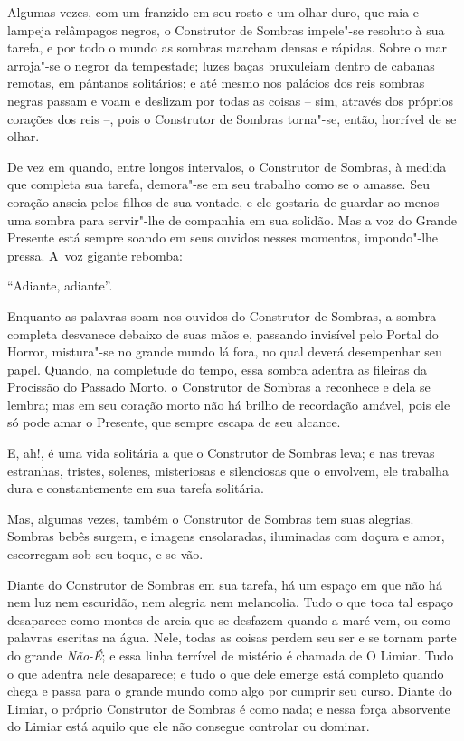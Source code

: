 Algumas vezes, com um franzido em seu rosto e um olhar duro, que raia e
lampeja relâmpagos negros, o Construtor de Sombras impele"-se resoluto à
sua tarefa, e por todo o mundo as sombras marcham densas e rápidas.
Sobre o mar arroja"-se o negror da tempestade; luzes baças bruxuleiam
dentro de cabanas remotas, em pântanos solitários; e até mesmo nos
palácios dos reis sombras negras passam e voam e deslizam por todas as
coisas -- sim, através dos próprios corações dos reis --, pois o
Construtor de Sombras torna"-se, então, horrível de se olhar.

De vez em quando, entre longos intervalos, o Construtor de Sombras, à
medida que completa sua tarefa, demora"-se em seu trabalho como se o
amasse. Seu coração anseia pelos filhos de sua vontade, e ele gostaria
de guardar ao menos uma sombra para servir"-lhe de companhia em sua
solidão. Mas a voz do Grande Presente está sempre soando em seus ouvidos
nesses momentos, impondo"-lhe pressa. A~voz gigante rebomba:

``Adiante, adiante''.

Enquanto as palavras soam nos ouvidos do Construtor de Sombras, a sombra
completa desvanece debaixo de suas mãos e, passando invisível pelo
Portal do Horror, mistura"-se no grande mundo lá fora, no qual deverá
desempenhar seu papel. Quando, na completude do tempo, essa sombra
adentra as fileiras da Procissão do Passado Morto, o Construtor de
Sombras a reconhece e dela se lembra; mas em seu coração morto não há
brilho de recordação amável, pois ele só pode amar o Presente, que
sempre escapa de seu alcance.

E, ah!, é uma vida solitária a que o Construtor de Sombras leva; e nas
trevas estranhas, tristes, solenes, misteriosas e silenciosas que o
envolvem, ele trabalha dura e constantemente em sua tarefa solitária.

Mas, algumas vezes, também o Construtor de Sombras tem suas alegrias.
Sombras bebês surgem, e imagens ensolaradas, iluminadas com doçura e
amor, escorregam sob seu toque, e se vão.

Diante do Construtor de Sombras em sua tarefa, há um espaço em que não
há nem luz nem escuridão, nem alegria nem melancolia. Tudo o que toca
tal espaço desaparece como montes de areia que se desfazem quando a maré
vem, ou como palavras escritas na água. Nele, todas as coisas perdem seu
ser e se tornam parte do grande \emph{Não-É}; e essa linha terrível de
mistério é chamada de O Limiar. Tudo o que adentra nele desaparece; e
tudo o que dele emerge está completo quando chega e passa para o grande
mundo como algo por cumprir seu curso. Diante do Limiar, o próprio
Construtor de Sombras é como nada; e nessa força absorvente do Limiar
está aquilo que ele não consegue controlar ou dominar.

